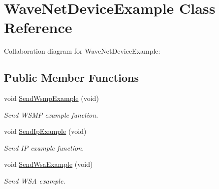 \hypertarget{classWaveNetDeviceExample}{}\section{Wave\+Net\+Device\+Example Class Reference}
\label{classWaveNetDeviceExample}


Collaboration diagram for Wave\+Net\+Device\+Example\+:
\subsection*{Public Member Functions}
\begin{DoxyCompactItemize}
\item 
void \hyperlink{classWaveNetDeviceExample_ad36808acd544ff68268912c9386213fe}{Send\+Wsmp\+Example} (void)
\begin{DoxyCompactList}\small\item\em Send W\+S\+MP example function. \end{DoxyCompactList}\item 
void \hyperlink{classWaveNetDeviceExample_a97da76e52cd76f5054e8c92cfae01a9e}{Send\+Ip\+Example} (void)
\begin{DoxyCompactList}\small\item\em Send IP example function. \end{DoxyCompactList}\item 
void \hyperlink{classWaveNetDeviceExample_ac1725733b797a26cd3655b58adad965e}{Send\+Wsa\+Example} (void)
\begin{DoxyCompactList}\small\item\em Send W\+SA example. \end{DoxyCompactList}\end{DoxyCompactItemize}
